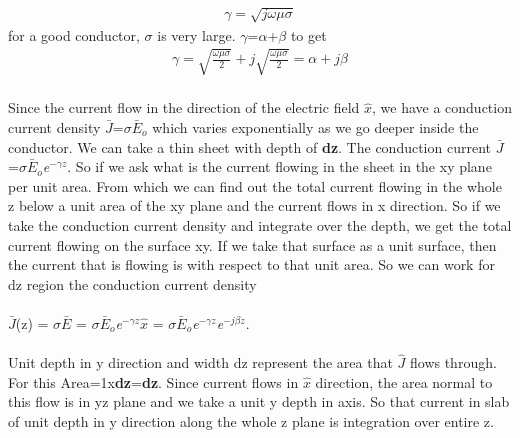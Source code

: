 \begin{align}
\gamma=\sqrt{\textit{j}\omega\mu\sigma}
\end{align}
for a good conductor, $\sigma$ is very large. $\gamma$=$\alpha$+$\beta$ to get
\begin{align}
\gamma=\sqrt{\frac{\omega\mu\sigma}{2}}+\textit{j}\sqrt{\frac{\omega\mu\sigma}{2}}=\alpha+\textit{j}\beta
\end{align}\\

Since the current flow in the direction of the electric field $\hat{x}$, we have a conduction current density $\bar{J}$=$\sigma\bar{E}_o$ which varies exponentially as we go deeper inside the conductor. We can take a thin sheet with depth of \textbf{dz}. The conduction current $\bar{J}$=$\sigma\bar{E}_o$\textit{e}$^{-\gamma z}$. So if we ask what is the current flowing in the sheet in the xy plane per unit area. From which we can find out the total current flowing in the whole z below a unit area of the xy plane and the current flows in x direction. So if we take the conduction current density and integrate over the depth, we get the total current flowing on the surface xy. If we take that surface as a unit surface, then the current that is flowing is with respect to that unit area. So we can work for dz region the conduction current density\\\\ $\bar{J}$(z) = $\sigma$$\bar{E}$ = $\sigma\bar{E}_o$\textit{e}$^{-\gamma z} \hat{x}$ = $\sigma\bar{E}_o$\textit{e}$^{-\gamma z}$\textit{e}$^{-j\beta z}$.\\\\
 Unit depth in y direction and width dz represent the area that $\hat{J}$ flows through. For this Area=1x\textbf{dz}=\textbf{dz}. Since current flows in $\hat{x}$ direction, the area normal to this flow is in yz plane and we take a unit y depth in  axis. So that current in slab of unit depth in y direction along the whole z plane is integration over entire z.\\

